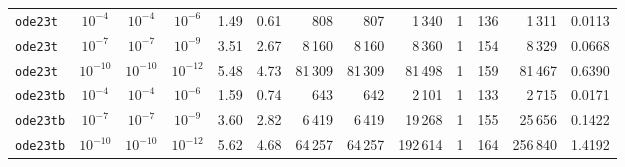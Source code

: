 \begin{tabular}{lcccrrrrrrrrr}
\addlinespace
\texttt{ode23t} & $10^{-4}$ & $10^{-4}$ & $10^{-6}$ & 1.49 & 0.61 & 808 & 807 & 1\,340 & 1 & 136 & 1\,311 & 0.0113 \\
\texttt{ode23t} & $10^{-7}$ & $10^{-7}$ & $10^{-9}$ & 3.51 & 2.67 & 8\,160 & 8\,160 & 8\,360 & 1 & 154 & 8\,329 & 0.0668 \\
\texttt{ode23t} & $10^{-10}$ & $10^{-10}$ & $10^{-12}$ & 5.48 & 4.73 & 81\,309 & 81\,309 & 81\,498 & 1 & 159 & 81\,467 & 0.6390 \\
\addlinespace
\texttt{ode23tb} & $10^{-4}$ & $10^{-4}$ & $10^{-6}$ & 1.59 & 0.74 & 643 & 642 & 2\,101 & 1 & 133 & 2\,715 & 0.0171 \\
\texttt{ode23tb} & $10^{-7}$ & $10^{-7}$ & $10^{-9}$ & 3.60 & 2.82 & 6\,419 & 6\,419 & 19\,268 & 1 & 155 & 25\,656 & 0.1422 \\
\texttt{ode23tb} & $10^{-10}$ & $10^{-10}$ & $10^{-12}$ & 5.62 & 4.68 & 64\,257 & 64\,257 & 192\,614 & 1 & 164 & 256\,840 & 1.4192 \\
\bottomrule
\end{tabular}
